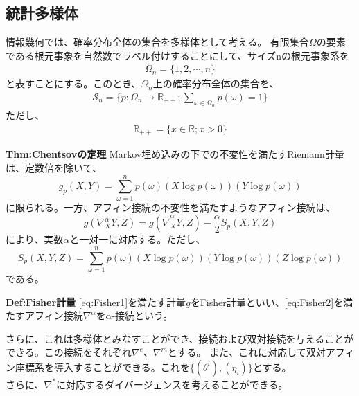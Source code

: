 \documentclass[a4paper,11pt]{jsarticle}
\numberwithin{equation}{section}
\begin{document}
\subsection{統計多様体}
情報幾何では、確率分布全体の集合を多様体として考える。
有限集合$\Omega$の要素である根元事象を自然数でラベル付けすることにして、サイズnの根元事象系を
\begin{align}
    \Omega_n = \{1,2,\cdots,n\}
\end{align}
と表すことにする。このとき、$\Omega_n$上の確率分布全体の集合を、
\begin{align}
    \mathcal{S}_n = \{p: \Omega_n \to \mathbb{R}_{++}; \sum_{\omega \in \Omega_n} p(\omega) = 1\}
\end{align}
ただし、
\begin{align}
    \mathbb{R}_{++} = \{x \in \mathbb{R}; x > 0\}
\end{align}



\begin{itembox}[l]{\textbf{Thm:Chentsovの定理}}
    Markov埋め込みの下での不変性を満たすRiemann計量は、定数倍を除いて、
    \begin{equation}
        \label{eq:Fisher1}
        g_p(X,Y) = \sum_{\omega = 1}^{n} p(\omega) (X\log p(\omega))(Y\log p(\omega))
    \end{equation}
    に限られる。一方、アフィン接続の不変性を満たすようなアフィン接続は、
    \begin{equation}    
        \label{eq:Fisher2}
        g(\nabla_X^{\alpha} Y,Z) = g(\tilde{\nabla}_X^{\alpha} Y,Z) - \frac{\alpha}{2} S_p(X,Y,Z)
    \end{equation}
    により、実数$\alpha$と一対一に対応する。ただし、
    \begin{equation}
        S_p(X,Y,Z) = \sum_{\omega = 1}^{n} p(\omega) (X\log p(\omega))(Y\log p(\omega))(Z\log p(\omega))
    \end{equation}
    である。
\end{itembox}

\begin{itembox}[l]{\textbf{Def:Fisher計量}}
    \ref{eq:Fisher1}を満たす計量$g$をFisher計量といい、\ref{eq:Fisher2}を満たすアフィン接続$\nabla^{\alpha}$を$\alpha$-接続という。
\end{itembox}
さらに、これは多様体とみなすことができ、接続および双対接続を与えることができる。この接続をそれぞれ$\nabla^{e}$、$\nabla^{m}$とする。
また、これに対応して双対アフィン座標系を導入することができる。これを$\{(\theta^i),(\eta_i)\}$とする。\\
さらに、$\nabla^*$に対応するダイバージェンスを考えることができる。
\end{document}
